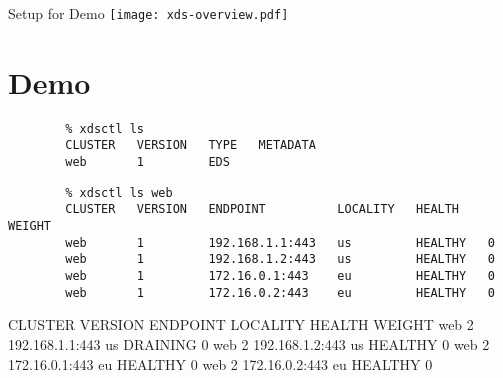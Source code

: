 \documentclass[aspectratio=169]{beamer}
\begin{document}
    \begin{frame}{Setup for Demo}
        \texttt{[image: xds-overview.pdf]}
    \end{frame}

    \section{Demo}
    \begin{frame}[fragile]

        \begin{verbatim}
        % xdsctl ls
        CLUSTER   VERSION   TYPE   METADATA
        web       1         EDS
        \end{verbatim}

        \begin{verbatim}
        % xdsctl ls web
        CLUSTER   VERSION   ENDPOINT          LOCALITY   HEALTH    WEIGHT
        web       1         192.168.1.1:443   us         HEALTHY   0
        web       1         192.168.1.2:443   us         HEALTHY   0
        web       1         172.16.0.1:443    eu         HEALTHY   0
        web       1         172.16.0.2:443    eu         HEALTHY   0
        \end{verbatim}

    \end{frame}

    \begin{frame}[fragile]

        \begin{verbbox}
        CLUSTER   VERSION   ENDPOINT          LOCALITY   HEALTH     WEIGHT
        web       2         192.168.1.1:443   us         DRAINING   0
        web       2         192.168.1.2:443   us         HEALTHY    0
        web       2         172.16.0.1:443    eu         HEALTHY    0
        web       2         172.16.0.2:443    eu         HEALTHY    0
        \end{verbbox}

    \end{frame}
\end{document}
